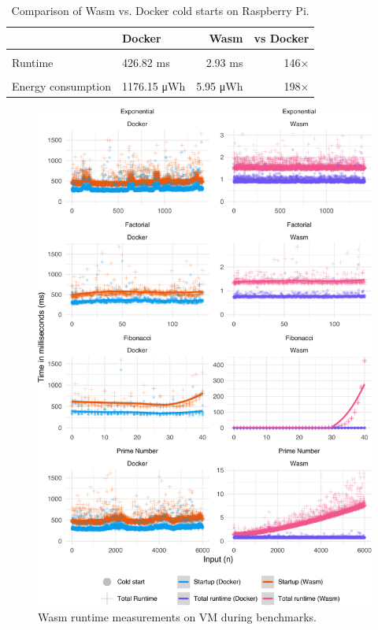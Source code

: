 \documentclass[
  table]{report}
\begin{document}
\begin{table}[H]
\centering
\caption{\label{tab:rpi_data_table}Comparison of Wasm vs. Docker cold starts on Raspberry Pi.\label{tab:rpi-avg}}
\centering
\begin{tabular}[t]{llrr}
\toprule
  & Docker & Wasm & vs Docker\\
\midrule
\cellcolor{gray!10}{Cold start} & \cellcolor{gray!10}{692.36 ms} & \cellcolor{gray!10}{3.19 ms} & \cellcolor{gray!10}{217×}\\
Runtime & 426.82 ms & 2.93 ms & 146×\\
\cellcolor{gray!10}{Total runtime} & \cellcolor{gray!10}{1119.18 ms} & \cellcolor{gray!10}{6.12 ms} & \cellcolor{gray!10}{183×}\\
Energy consumption & 1176.15 μWh & 5.95 μWh & 198×\\
\bottomrule
\end{tabular}
\end{table}

\newpage

\begin{figure}[H]

{\centering \includegraphics{thesis_files/figure-latex/nrec-efficiency-1} 

}

\caption{Wasm runtime measurements on VM during benchmarks.\label{nrec-efficiency}}\label{fig:nrec-efficiency}
\end{figure}
\end{document}

